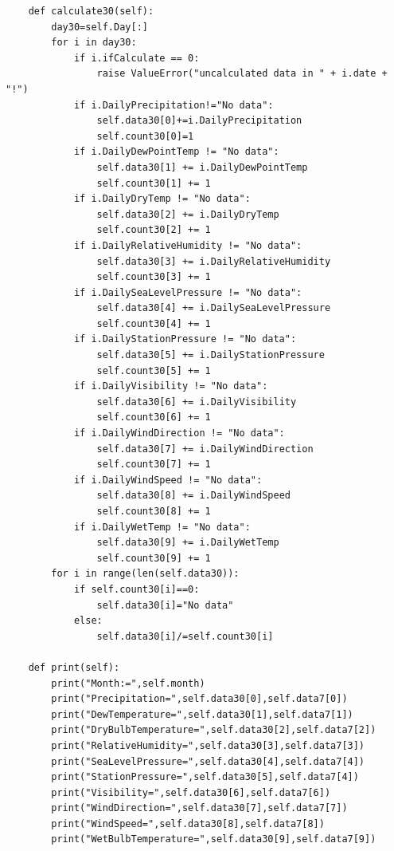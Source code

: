 \documentclass{ctexart}
\begin{document}
\begin{scriptsize}
\begin{verbatim}
    def calculate30(self):
        day30=self.Day[:]
        for i in day30:
            if i.ifCalculate == 0:
                raise ValueError("uncalculated data in " + i.date + "!")
            if i.DailyPrecipitation!="No data":
                self.data30[0]+=i.DailyPrecipitation
                self.count30[0]=1
            if i.DailyDewPointTemp != "No data":
                self.data30[1] += i.DailyDewPointTemp
                self.count30[1] += 1
            if i.DailyDryTemp != "No data":
                self.data30[2] += i.DailyDryTemp
                self.count30[2] += 1
            if i.DailyRelativeHumidity != "No data":
                self.data30[3] += i.DailyRelativeHumidity
                self.count30[3] += 1
            if i.DailySeaLevelPressure != "No data":
                self.data30[4] += i.DailySeaLevelPressure
                self.count30[4] += 1
            if i.DailyStationPressure != "No data":
                self.data30[5] += i.DailyStationPressure
                self.count30[5] += 1
            if i.DailyVisibility != "No data":
                self.data30[6] += i.DailyVisibility
                self.count30[6] += 1
            if i.DailyWindDirection != "No data":
                self.data30[7] += i.DailyWindDirection
                self.count30[7] += 1
            if i.DailyWindSpeed != "No data":
                self.data30[8] += i.DailyWindSpeed
                self.count30[8] += 1
            if i.DailyWetTemp != "No data":
                self.data30[9] += i.DailyWetTemp
                self.count30[9] += 1
        for i in range(len(self.data30)):
            if self.count30[i]==0:
                self.data30[i]="No data"
            else:
                self.data30[i]/=self.count30[i]

    def print(self):
        print("Month:=",self.month)
        print("Precipitation=",self.data30[0],self.data7[0])
        print("DewTemperature=",self.data30[1],self.data7[1])
        print("DryBulbTemperature=",self.data30[2],self.data7[2])
        print("RelativeHumidity=",self.data30[3],self.data7[3])
        print("SeaLevelPressure=",self.data30[4],self.data7[4])
        print("StationPressure=",self.data30[5],self.data7[4])
        print("Visibility=",self.data30[6],self.data7[6])
        print("WindDirection=",self.data30[7],self.data7[7])
        print("WindSpeed=",self.data30[8],self.data7[8])
        print("WetBulbTemperature=",self.data30[9],self.data7[9])



\end{verbatim}
\end{scriptsize}
\end{document}

